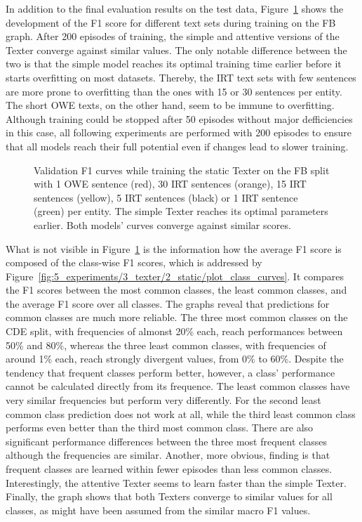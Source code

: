 In addition to the final evaluation results on the test data, Figure~\ref{fig:5_experiments/3_texter/2_static/plot_valid_curves} shows the development of the F1 score for different text sets during training on the FB graph. After 200 episodes of training, the simple and attentive versions of the Texter converge against similar values. The only notable difference between the two is that the simple model reaches its optimal training time earlier before it starts overfitting on most datasets. Thereby, the IRT text sets with few sentences are more prone to overfitting than the ones with 15 or 30 sentences per entity. The short OWE texts, on the other hand, seem to be immune to overfitting. Although training could be stopped after 50 episodes without major defficiencies in this case, all following experiments are performed with 200 episodes to ensure that all models reach their full potential even if changes lead to slower training.

\begin{figure}[t]
    \centering
    
    \caption{Validation F1 curves while training the static Texter on the FB split with 1 OWE sentence (red), 30 IRT sentences (orange), 15 IRT sentences (yellow), 5 IRT sentences (black) or 1 IRT sentence (green) per entity. The simple Texter reaches its optimal parameters earlier. Both models' curves converge against similar scores.}
    \label{fig:5_experiments/3_texter/2_static/plot_valid_curves}
\end{figure}

What is not visible in Figure~\ref{fig:5_experiments/3_texter/2_static/plot_valid_curves} is the information how the average F1 score is composed of the class-wise F1 scores, which is addressed by Figure~\ref{fig:5_experiments/3_texter/2_static/plot_class_curves}. It compares the F1 scores between the most common classes, the least common classes, and the average F1 score over all classes. The graphs reveal that predictions for common classes are much more reliable. The three most common classes on the CDE split, with frequencies of almonst 20\% each, reach performances between 50\% and 80\%, whereas the three least common classes, with frequencies of around 1\% each, reach strongly divergent values, from 0\% to 60\%. Despite the tendency that frequent classes perform better, however, a class' performance cannot be calculated directly from its frequence. The least common classes have very similar frequencies but perform very differently. For the second least common class prediction does not work at all, while the third least common class performs even better than the third most common class. There are also significant performance differences between the three most frequent classes although the frequencies are similar. Another, more obvious, finding is that frequent classes are learned within fewer episodes than less common classes. Interestingly, the attentive Texter seems to learn faster than the simple Texter. Finally, the graph shows that both Texters converge to similar values for all classes, as might have been assumed from the similar macro F1 values.

